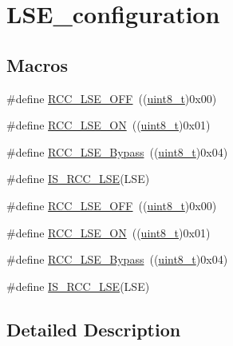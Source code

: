 \hypertarget{group___l_s_e__configuration}{}\section{L\+S\+E\+\_\+configuration}
\label{group___l_s_e__configuration}
\subsection*{Macros}
\begin{DoxyCompactItemize}
\item 
\#define \hyperlink{group___l_s_e__configuration_ga6645c27708d0cad1a4ab61d2abb24c77}{R\+C\+C\+\_\+\+L\+S\+E\+\_\+\+O\+FF}~((\hyperlink{_p_e___types_8h_aba7bc1797add20fe3efdf37ced1182c5}{uint8\+\_\+t})0x00)
\item 
\#define \hyperlink{group___l_s_e__configuration_gac981ea636c2f215e4473901e0912f55a}{R\+C\+C\+\_\+\+L\+S\+E\+\_\+\+ON}~((\hyperlink{_p_e___types_8h_aba7bc1797add20fe3efdf37ced1182c5}{uint8\+\_\+t})0x01)
\item 
\#define \hyperlink{group___l_s_e__configuration_gac911af00bffa1bd1b1676f582a8a88e1}{R\+C\+C\+\_\+\+L\+S\+E\+\_\+\+Bypass}~((\hyperlink{_p_e___types_8h_aba7bc1797add20fe3efdf37ced1182c5}{uint8\+\_\+t})0x04)
\item 
\#define \hyperlink{group___l_s_e__configuration_ga95d2678bf8f46e932e7cba75619a4d2c}{I\+S\+\_\+\+R\+C\+C\+\_\+\+L\+SE}(L\+SE)
\item 
\#define \hyperlink{group___l_s_e__configuration_ga6645c27708d0cad1a4ab61d2abb24c77}{R\+C\+C\+\_\+\+L\+S\+E\+\_\+\+O\+FF}~((\hyperlink{_p_e___types_8h_aba7bc1797add20fe3efdf37ced1182c5}{uint8\+\_\+t})0x00)
\item 
\#define \hyperlink{group___l_s_e__configuration_gac981ea636c2f215e4473901e0912f55a}{R\+C\+C\+\_\+\+L\+S\+E\+\_\+\+ON}~((\hyperlink{_p_e___types_8h_aba7bc1797add20fe3efdf37ced1182c5}{uint8\+\_\+t})0x01)
\item 
\#define \hyperlink{group___l_s_e__configuration_gac911af00bffa1bd1b1676f582a8a88e1}{R\+C\+C\+\_\+\+L\+S\+E\+\_\+\+Bypass}~((\hyperlink{_p_e___types_8h_aba7bc1797add20fe3efdf37ced1182c5}{uint8\+\_\+t})0x04)
\item 
\#define \hyperlink{group___l_s_e__configuration_ga95d2678bf8f46e932e7cba75619a4d2c}{I\+S\+\_\+\+R\+C\+C\+\_\+\+L\+SE}(L\+SE)
\end{DoxyCompactItemize}


\subsection{Detailed Description}


